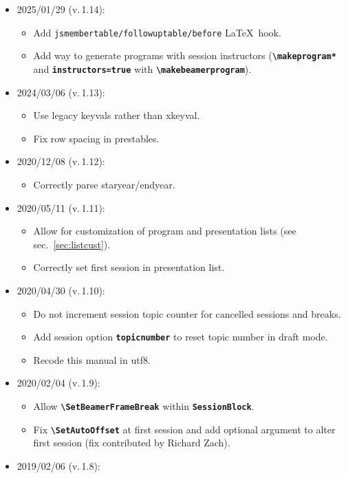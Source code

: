 \documentclass[english]{article}
\newcommand*\jmacro[1]{\textbf{\texttt{#1}}}
\newcommand*\jcsmacro[1]{\jmacro{\textbackslash{#1}}}
\newcommand*\joption[1]{\textbf{\texttt{#1}}}
\begin{document}
\begin{itemize}
\item 2025/01/29 (v.\,1.14):
\begin{itemize}
	\item Add \texttt{jsmembertable/followuptable/before} \LaTeX\ hook.
	\item Add way to generate programs with session instructors
	      (\jcsmacro{makeprogram*} and \joption{instructors=true}
	       with \jcsmacro{makebeamerprogram}).
\end{itemize}
\item 2024/03/06 (v.\,1.13):
\begin{itemize}
	\item Use legacy keyvals rather than \textsf{xkeyval}.
	\item Fix row spacing in prestables.
\end{itemize}
\item 2020/12/08 (v.\,1.12):
	\begin{itemize}
		\item Correctly parse staryear/endyear.
	\end{itemize}
\item 2020/05/11 (v.\,1.11):
	\begin{itemize}
		\item Allow for customization of program and presentation lists (see sec.~\ref{sec:listcust}).
		\item Correctly set first session in presentation list.
	\end{itemize}
\item 2020/04/30 (v.\,1.10):
	\begin{itemize}
		\item Do not increment session topic counter for cancelled sessions and breaks.
		\item Add session option \joption{topicnumber} to reset topic number in draft mode.
		\item Recode this manual in utf8.
	\end{itemize}
\item 2020/02/04 (v.\,1.9):
	\begin{itemize}
		\item Allow \jcsmacro{SetBeamerFrameBreak} within \joption{SessionBlock}.
		\item Fix \jcsmacro{SetAutoOffset} at first session and add optional argument
		      to alter first session (fix contributed by Richard Zach).
	\end{itemize}
\item 2019/02/06 (v.\,1.8):

\end{itemize}
\end{document}
